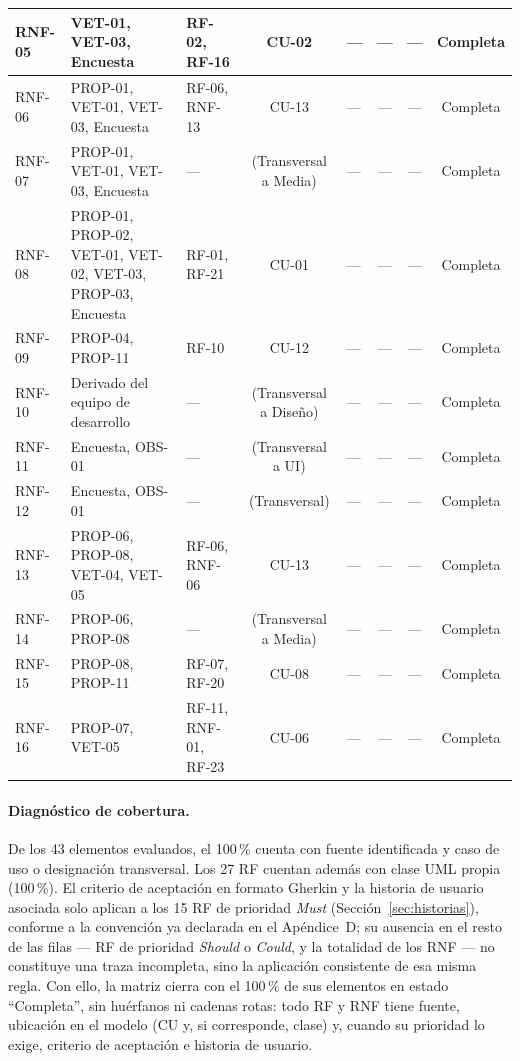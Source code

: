 \documentclass[journal,onecolumn]{IEEEtran}
\begin{document}
\begin{landscape}
\begin{table}[H]
\begin{tabularx}{\linewidth}{|l|X|X|c|X|c|c|c|}
RNF-05 & VET-01, VET-03, Encuesta & RF-02, RF-16 & CU-02 & --- & --- & --- & Completa \\ \hline
RNF-06 & PROP-01, VET-01, VET-03, Encuesta & RF-06, RNF-13 & CU-13 & --- & --- & --- & Completa \\ \hline
RNF-07 & PROP-01, VET-01, VET-03, Encuesta & --- & (Transversal a Media) & --- & --- & --- & Completa \\ \hline
RNF-08 & PROP-01, PROP-02, VET-01, VET-02, VET-03, PROP-03, Encuesta & RF-01, RF-21 & CU-01 & --- & --- & --- & Completa \\ \hline
RNF-09 & PROP-04, PROP-11 & RF-10 & CU-12 & --- & --- & --- & Completa \\ \hline
RNF-10 & Derivado del equipo de desarrollo & --- & (Transversal a Diseño) & --- & --- & --- & Completa \\ \hline
RNF-11 & Encuesta, OBS-01 & --- & (Transversal a UI) & --- & --- & --- & Completa \\ \hline
RNF-12 & Encuesta, OBS-01 & --- & (Transversal) & --- & --- & --- & Completa \\ \hline
RNF-13 & PROP-06, PROP-08, VET-04, VET-05 & RF-06, RNF-06 & CU-13 & --- & --- & --- & Completa \\ \hline
RNF-14 & PROP-06, PROP-08 & --- & (Transversal a Media) & --- & --- & --- & Completa \\ \hline
RNF-15 & PROP-08, PROP-11 & RF-07, RF-20 & CU-08 & --- & --- & --- & Completa \\ \hline
RNF-16 & PROP-07, VET-05 & RF-11, RNF-01, RF-23 & CU-06 & --- & --- & --- & Completa \\ \hline
		\end{tabularx}
	\end{table}
\end{landscape}

\paragraph{Diagnóstico de cobertura.} De los 43 elementos evaluados, el
100\,\% cuenta con fuente identificada y caso de uso o designación
transversal. Los 27 RF cuentan además con clase UML propia (100\,\%). El
criterio de aceptación en formato Gherkin y la historia de usuario asociada
solo aplican a los 15 RF de prioridad \emph{Must}
(Sección~\ref{sec:historias}), conforme a la convención ya declarada en el
Apéndice~D; su ausencia en el resto de las filas --- RF de prioridad
\emph{Should} o \emph{Could}, y la totalidad de los RNF --- no constituye
una traza incompleta, sino la aplicación consistente de esa misma regla. Con
ello, la matriz cierra con el 100\,\% de sus elementos en estado
\enquote{Completa}, sin huérfanos ni cadenas rotas: todo RF y RNF tiene
fuente, ubicación en el modelo (CU y, si corresponde, clase) y, cuando su
prioridad lo exige, criterio de aceptación e historia de usuario.
\end{document}
